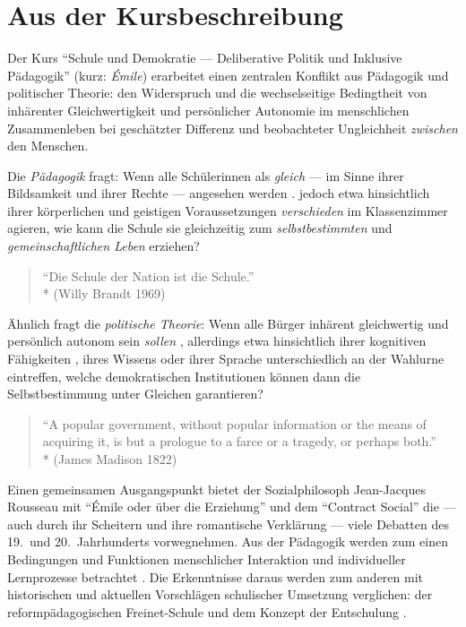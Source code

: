 \section[Kursbeschreibung]{Aus der Kursbeschreibung}

Der Kurs ``Schule und Demokratie --- Deliberative Politik und Inklusive Pädagogik'' (kurz: \emph{Émile}) erarbeitet einen zentralen Konflikt aus Pädagogik und politischer Theorie:
den Widerspruch und die wechselseitige Bedingtheit von inhärenter Gleichwertigkeit und persönlicher Autonomie im menschlichen Zusammenleben bei geschätzter Differenz und beobachteter Ungleichheit \emph{zwischen} den Menschen.

Die \emph{Pädagogik} fragt:
Wenn alle Schülerinnen als \emph{gleich} --- im Sinne ihrer Bildsamkeit und ihrer Rechte --- angesehen werden \parencites[vgl.][]{UN-2008,benner-2012}.
jedoch etwa hinsichtlich ihrer körperlichen und geistigen Voraussetzungen \emph{verschieden} im Klassenzimmer agieren, wie kann die Schule sie gleichzeitig zum \emph{selbstbestimmten} und \emph{gemeinschaftlichen Leben} erziehen?

\begin{quote}
    ``Die Schule der Nation ist die Schule.''\\*
    (Willy Brandt 1969)
\end{quote}

Ähnlich fragt die \emph{politische Theorie}:
Wenn alle Bürger inhärent gleichwertig und persönlich autonom sein \emph{sollen} \parencite[etwa][]{Dahl-1989-aa}, allerdings etwa hinsichtlich ihrer kognitiven Fähigkeiten \parencite{Rosenberg-2002-aa}, ihres Wissens \parencite[etwa][]{Converse-1970-aa} oder ihrer Sprache unterschiedlich an der Wahlurne eintreffen, welche demokratischen Institutionen können dann die Selbstbestimmung unter Gleichen garantieren?

\begin{quote}
    ``A popular government, without popular information or the means of acquiring it, is but a prologue to a farce or a tragedy, or perhaps both.''\\*
    (James Madison 1822)
\end{quote}

Einen gemeinsamen Ausgangspunkt bietet der Sozialphilosoph Jean-Jacques Rousseau mit ``Émile oder über die Erziehung'' \parencite*{rousseau-1762} und dem ``Contract Social'' \parencite*{Rousseau-1762-b} die --- auch durch ihr Scheitern und ihre romantische Verklärung --- viele Debatten des 19.\ und 20.\ Jahrhunderts vorwegnehmen.
Aus der Pädagogik werden zum einen Bedingungen und Funktionen menschlicher Interaktion und individueller Lernprozesse betrachtet \parencites{siebert-2003,benner-2012,mead-1934en}.
Die Erkenntnisse daraus werden zum anderen mit historischen und aktuellen Vorschlägen schulischer Umsetzung verglichen: der reformpädagogischen Freinet-Schule und dem Konzept der Entschulung \parencites{Freinet1979,Illich-1971}.


